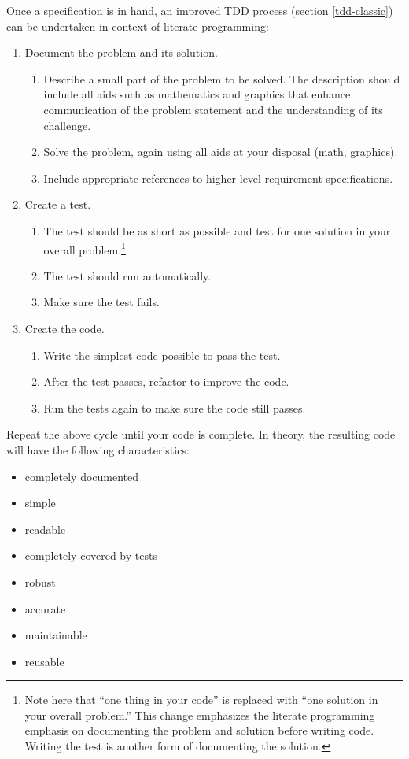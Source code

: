 Once a specification is in hand, an improved TDD process (section \ref{tdd-classic}) can be 
undertaken in context of literate programming:
\begin{enumerate}
\item Document the problem and its solution.
  \begin{enumerate}
  \item Describe a small part of the problem to be solved. The description should include    
all aids such as mathematics and graphics that enhance communication of the problem 
statement and the understanding of its challenge. 
  \item Solve the problem, again using all aids at your disposal (\eg math, graphics).
  \item Include appropriate references to higher level requirement specifications.
  \end{enumerate}
\item Create a test. 
\begin{enumerate}
  \item The test should be as short as possible and test for one solution in your overall
  problem.\footnote{Note here that ``one thing in your code'' is replaced with ``one
  solution in your overall problem.'' This change emphasizes the literate programming emphasis
  on documenting the problem and solution before writing code. Writing the test is another
  form of documenting the solution.}
  \item The test should run automatically.
  \item Make sure the test fails. 
\end{enumerate}
\item Create the code.
  \begin{enumerate}
  \item Write the simplest code possible to pass the test. 
  \item After the test passes, refactor to improve the code. 
  \item Run the tests again to make sure the code still passes.
  \end{enumerate}
\end{enumerate}

Repeat the above cycle until your code is complete. In theory, the resulting code will 
have the following characteristics:
\begin{itemize}
  \item completely documented
  \item simple
  \item readable
  \item completely covered by tests
  \item robust
  \item accurate
  \item maintainable
  \item reusable
\end{itemize}

